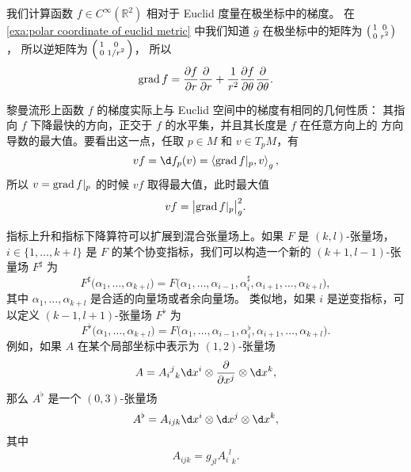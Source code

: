 \begin{example}
  我们计算函数 $f\in C^\infty(\mathbb{R}^2)$ 相对于 Euclid 度量在极坐标中的梯度。
  在 \autoref{exa:polar coordinate of euclid metric} 中我们知道 $\bar g$
  在极坐标中的矩阵为 $\begin{psmallmatrix}1 & 0 \\ 0 & r^2\end{psmallmatrix}$，
  所以逆矩阵为 $\begin{psmallmatrix}1 & 0 \\ 0 & 1/r^2\end{psmallmatrix}$，
  所以 
  \[
    \operatorname{grad} f=\frac{\partial f}{\partial r}\frac{\partial}{\partial r}+
    \frac{1}{r^2}\frac{\partial f}{\partial\theta}  \frac{\partial}{\partial \theta}.
  \]
\end{example}

黎曼流形上函数 $f$ 的梯度实际上与 Euclid 空间中的梯度有相同的几何性质：
其指向 $f$ 下降最快的方向，正交于 $f$ 的水平集，并且其长度是 $f$ 在任意方向上的
方向导数的最大值。要看出这一点，任取 $p\in M$ 和 $v\in T_pM$，有
\[
  vf=\d f_p(v)=  \inn{\grad f|_p,v}_g,
\]
所以 $v=\operatorname{grad} f|_p$ 的时候 $vf$ 取得最大值，此时最大值
\[
  vf=\bigl|\operatorname{grad} f|_p\bigr|_g^2.
\]

指标上升和指标下降算符可以扩展到混合张量场上。如果 $F$ 是 $(k,l)$-张量场，
$i\in\{1,\dots,k+l\}$ 是 $F$ 的某个协变指标，我们可以构造一个新的 $(k+1,l-1)$-张量场
$F^\sharp$ 为
\[
  F^\sharp\bigl(\alpha_1,\dots,\alpha_{k+l}\bigr)=
  F\bigl(\alpha_1,\dots,\alpha_{i-1},\alpha_i^\sharp,\alpha_{i+1},\dots,\alpha_{k+l}\bigr),
\]
其中 $\alpha_1,\dots,\alpha_{k+l}$ 是合适的向量场或者余向量场。
类似地，如果 $i$ 是逆变指标，可以定义 $(k-1,l+1)$-张量场 $F^\flat$
为
\[
  F^\flat\bigl(\alpha_1,\dots,\alpha_{k+l}\bigr)=
  F\bigl(\alpha_1,\dots,\alpha_{i-1},\alpha_i^\flat,\alpha_{i+1},\dots,\alpha_{k+l}\bigr).
\]
例如，如果 $A$ 在某个局部坐标中表示为 $(1,2)$-张量场
\[
  A={{A_{i}}^j}_k\d x^i\otimes \frac{\partial}{\partial x^j}\otimes \d x^k,
\]
那么 $A^\flat$ 是一个 $(0,3)$-张量场
\[
  A^\flat =A_{ijk}\d x^i\otimes \d x^j\otimes \d x^k,  
\]
其中
\[
  A_{ijk}= g_{jl}  {{A_{i}}^l}_k.
\]

